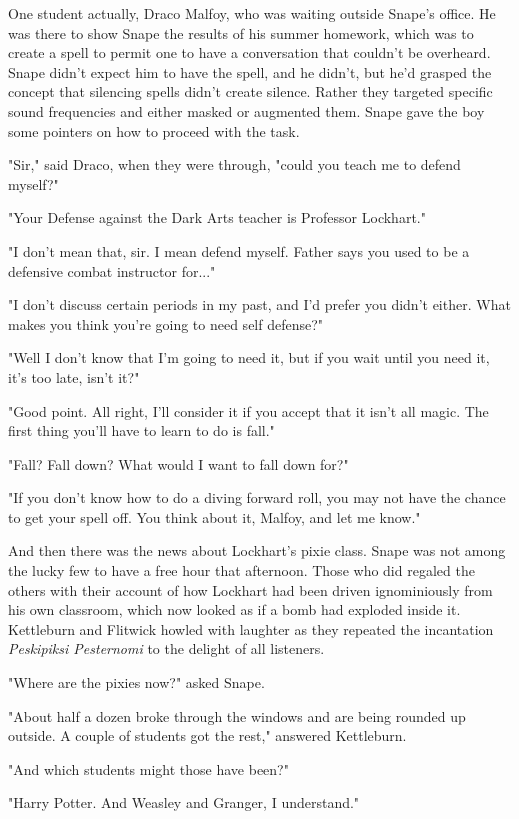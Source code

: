\documentclass[a4paper,11pt]{article}
\begin{document}
One student actually, Draco Malfoy, who was waiting outside Snape's office. He was there to show Snape the results of his summer homework, which was to create a spell to permit one to have a conversation that couldn't be overheard. Snape didn't expect him to have the spell, and he didn't, but he'd grasped the concept that silencing spells didn't create silence. Rather they targeted specific sound frequencies and either masked or augmented them. Snape gave the boy some pointers on how to proceed with the task.

"Sir," said Draco, when they were through, "could you teach me to defend myself?"

"Your Defense against the Dark Arts teacher is Professor Lockhart."

"I don't mean that, sir. I mean defend myself. Father says you used to be a defensive combat instructor for..."

"I don't discuss certain periods in my past, and I'd prefer you didn't either. What makes you think you're going to need self defense?"

"Well I don't know that I'm going to need it, but if you wait until you need it, it's too late, isn't it?"

"Good point. All right, I'll consider it if you accept that it isn't all magic. The first thing you'll have to learn to do is fall."

"Fall? Fall down? What would I want to fall down for?"

"If you don't know how to do a diving forward roll, you may not have the chance to get your spell off. You think about it, Malfoy, and let me know."

And then there was the news about Lockhart's pixie class. Snape was not among the lucky few to have a free hour that afternoon. Those who did regaled the others with their account of how Lockhart had been driven ignominiously from his own classroom, which now looked as if a bomb had exploded inside it. Kettleburn and Flitwick howled with laughter as they repeated the incantation \emph{Peskipiksi Pesternomi} to the delight of all listeners.

"Where are the pixies now?" asked Snape.

"About half a dozen broke through the windows and are being rounded up outside. A couple of students got the rest," answered Kettleburn.

"And which students might those have been?"

"Harry Potter. And Weasley and Granger, I understand."
\end{document}
